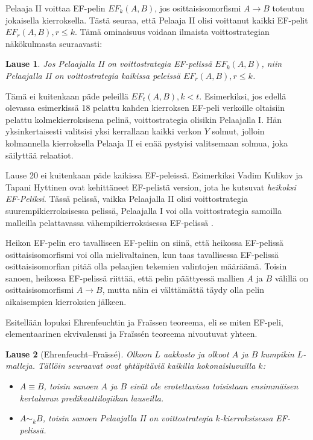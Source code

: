 \documentclass[finnish]{tktltiki2}
\newtheorem{lau}{Lause}
\theoremstyle{definition}
\theoremstyle{remark}
\begin{document}
Pelaaja II voittaa EF-pelin $EF_k(A, B)$, jos osittaisisomorfismi $A \rightarrow B$ toteutuu jokaisella kierroksella. Tästä seuraa, että Pelaaja II olisi voittanut kaikki EF-pelit $EF_r(A, B), r \leq k$. Tämä ominaisuus voidaan ilmaista voittostrategian näkökulmasta seuraavasti:
\begin{lau}
Jos Pelaajalla II on voittostrategia EF-pelissä $EF_k(A, B)$, niin Pelaajalla II on voittostrategia kaikissa peleissä $EF_r(A, B), r \leq k$.
\end{lau}

Tämä ei kuitenkaan päde peleillä $EF_t(A, B), k < t$. Esimerkiksi, jos edellä olevassa esimerkissä 18 pelattu kahden kierroksen EF-peli verkoille oltaisiin pelattu kolmekierroksisena pelinä, voittostrategia olisikin Pelaajalla I. Hän yksinkertaisesti valitsisi yksi kerrallaan kaikki verkon $Y$ solmut, jolloin kolmannella kierroksella Pelaaja II ei enää pystyisi valitsemaan solmua, joka säilyttää relaatiot.

Lause 20 ei kuitenkaan päde kaikissa EF-peleissä. Esimerkiksi Vadim Kulikov ja Tapani Hyttinen ovat kehittäneet EF-pelistä version, jota he kutsuvat \textit{heikoksi EF-Peliksi}. Tässä pelissä, vaikka Pelaajalla II olisi voittostrategia suurempikierroksisessa pelissä, Pelaajalla I voi olla voittostrategia samoilla malleilla pelattavassa vähempikierroksisessa EF-pelissä \cite{Hyt11}.

Heikon EF-pelin ero tavalliseen EF-peliin on siinä, että heikossa EF-pelissä osittaisisomorfismi voi olla mielivaltainen, kun taas tavallisessa EF-pelissä osittaisisomorfian pitää olla pelaajien tekemien valintojen määräämä. Toisin sanoen, heikossa EF-pelissä riittää, että pelin päättyessä mallien $A$ ja $B$ välillä on osittaisisomorfismi $A \rightarrow B$, mutta näin ei välttämättä täydy olla pelin aikaisempien kierroksien jälkeen.

Esitellään lopuksi Ehrenfeuchtin ja Fraïssen teoreema, eli se miten EF-peli, elementaarinen ekvivalenssi ja Fraïssén teoreema nivoutuvat yhteen.
\begin{lau}[Ehrenfeucht--Fraïssé]
Olkoon $L$ aakkosto ja olkoot $A$ ja $B$ kumpikin $L$-malleja. Tällöin seuraavat ovat yhtäpitäviä kaikilla kokonaisluvuilla $k$:
\begin{itemize}
\item $A \equiv B$, toisin sanoen $A$ ja $B$ eivät ole erotettavissa toisistaan ensimmäisen kertaluvun predikaattilogiikan lauseilla.
\item $A \sim_k B$, toisin sanoen Pelaajalla II on voittostrategia $k$-kierroksisessa EF-pelissä.
\end{itemize}
\end{lau}
\end{document}
